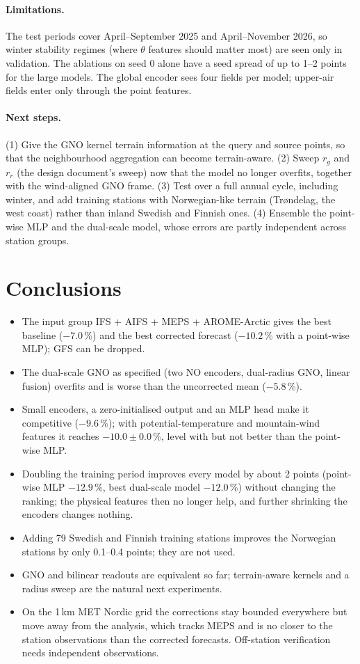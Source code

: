 \documentclass[10pt,a4paper]{article}
\begin{document}
\paragraph{Limitations.} The test periods cover April--September 2025 and April--November 2026, so
winter stability regimes (where $\theta$ features should matter most) are seen only in validation. The ablations on seed 0
alone have a seed spread of up to 1--2 points for the large models. The global encoder sees four
fields per model; upper-air fields enter only through the point features.

\paragraph{Next steps.} (1) Give the GNO kernel terrain information at the query and source points,
so that the neighbourhood aggregation can become terrain-aware. (2) Sweep $r_g$ and $r_r$ (the design
document's sweep) now that the model no longer overfits, together with the wind-aligned GNO frame.
(3) Test over a full annual cycle, including winter, and add training stations with Norwegian-like
terrain (Tr{\o}ndelag, the west coast) rather than inland Swedish and Finnish ones. (4) Ensemble the point-wise MLP and the dual-scale
model, whose errors are partly independent across station groups.

\section{Conclusions}
\begin{itemize}\itemsep1pt
\item The input group IFS + AIFS + MEPS + AROME-Arctic gives the best baseline ($-7.0$\,\%) and the
best corrected forecast ($-10.2$\,\% with a point-wise MLP); GFS can be dropped.
\item The dual-scale GNO as specified (two NO encoders, dual-radius GNO, linear fusion) overfits and
is worse than the uncorrected mean ($-5.8$\,\%).
\item Small encoders, a zero-initialised output and an MLP head make it competitive ($-9.6$\,\%);
with potential-temperature and mountain-wind features it reaches $-10.0\pm0.0$\,\%, level with but
not better than the point-wise MLP.
\item Doubling the training period improves every model by about 2 points (point-wise MLP
$-12.9$\,\%, best dual-scale model $-12.0$\,\%) without changing the ranking; the physical features
then no longer help, and further shrinking the encoders changes nothing.
\item Adding 79 Swedish and Finnish training stations improves the Norwegian stations by only
0.1--0.4 points; they are not used.
\item GNO and bilinear readouts are equivalent so far; terrain-aware kernels and a radius sweep are
the natural next experiments.
\item On the 1\,km MET Nordic grid the corrections stay bounded everywhere but move away from the
analysis, which tracks MEPS and is no closer to the station observations than the corrected
forecasts. Off-station verification needs independent observations.
\end{itemize}
\end{document}
